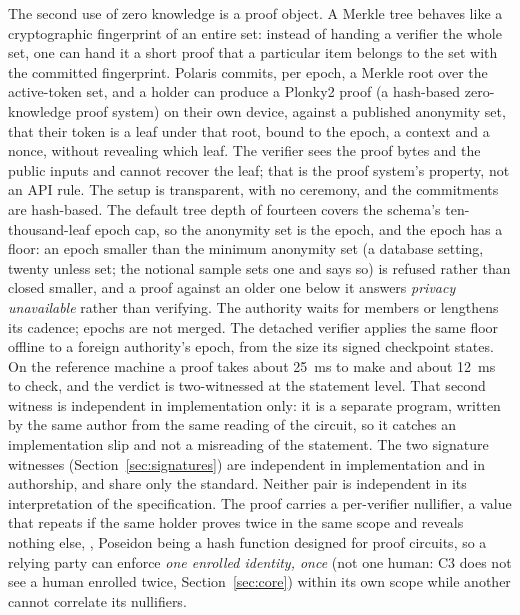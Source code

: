 The second use of zero knowledge is a proof object. A Merkle tree behaves like a cryptographic
fingerprint of an entire set: instead of handing a verifier the whole set, one can hand it a short
proof that a particular item belongs to the set with the committed fingerprint. Polaris commits, per
epoch, a Merkle root over the active-token set, and a holder can produce a Plonky2 proof (a hash-based zero-knowledge proof system) on their own
device, against a published anonymity set, that their token is a leaf under that root, bound to the
epoch, a context and a nonce, without revealing which leaf. The verifier sees the proof bytes and the
public inputs and cannot recover the leaf; that is the proof system's property, not an API rule. The
setup is transparent, with no ceremony, and the commitments are hash-based. The default tree depth
of fourteen covers the schema's ten-thousand-leaf epoch cap, so the anonymity set is the epoch, and
the epoch has a floor: an epoch smaller than the minimum anonymity set (a database setting, twenty
unless set; the notional sample sets one and says so) is refused rather than closed smaller, and a proof against an older one below it answers \emph{privacy unavailable}
rather than verifying. The authority waits for members or lengthens its cadence; epochs are not
merged. The detached verifier applies the same floor offline to a foreign authority's epoch, from the
size its signed checkpoint states.
On the reference machine a proof takes about 25~ms to make and about 12~ms to check, and the verdict
is two-witnessed at the statement level. That second witness is independent in implementation
only: it is a separate program, written by the same author from the same reading of the circuit,
so it catches an implementation slip and not a misreading of the statement. The two signature
witnesses (Section~\ref{sec:signatures}) are independent in implementation and in authorship, and
share only the standard. Neither pair is independent in its interpretation of the specification.
The proof carries a per-verifier nullifier, a value that repeats if the same holder proves twice in the
same scope and reveals nothing else,
, Poseidon being a hash function designed for proof
circuits, so a relying party can enforce \emph{one enrolled
identity, once} (not one human: C3 does not see a human enrolled twice, Section~\ref{sec:core})
within its own scope while another cannot correlate its nullifiers. \sImpl

